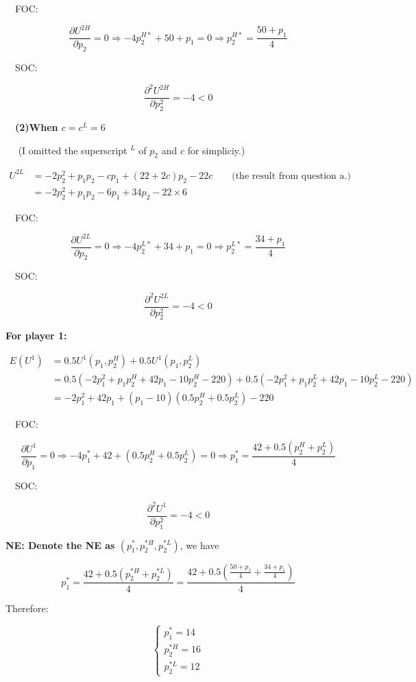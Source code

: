 \documentclass{article}
\begin{document}
$\quad $FOC:

$$\frac{\partial U^{2H}}{\partial p_2} = 0 \Rightarrow -4p^{H*}_2+ 50 + p_1 = 0 \Rightarrow p^{H*}_2 = \frac{50+p_1}{4}$$

$\quad $SOC:

$$\frac{\partial^2 U^{2H}}{\partial p^2_2} = -4 <0$$



\textbf{$\quad $(2)When $c=c^L=6$}

\smallskip

$\quad $ (I omitted the superscript $^L$ of $p_2$ and $c$ for simpliciy.)

\begin{align*}
U^{2L} &= -2p_2^2 +p_1p_2 -cp_1 + (22+2c)p_2 -22c \quad \quad \text{(the result from question a.)}  \\
&= -2p_2^2 +p_1p_2 -6p_1 + 34p_2 -22 \times 6
\end{align*}


$\quad $FOC:

$$\frac{\partial U^{2L}}{\partial p_2} = 0 \Rightarrow -4p^{L*}_2+ 34 + p_1 = 0 \Rightarrow p^{L*}_2 = \frac{34+p_1}{4}$$

$\quad $SOC:

$$\frac{\partial^2 U^{2L}}{\partial p^2_2} = -4 <0$$



\textbf{For player 1:}

\begin{align*}
E(U^1)&= 0.5 U^1(p_1,p_2^H) + 0.5 U^1(p_1,p_2^L) \\
&= 0.5(-2p_1^2 +p_1p^H_2 + 42p_1 - 10p^H_2 -220) + 0.5(-2p_1^2 +p_1p^L_2 + 42p_1 - 10p^L_2 -220)\\
&=-2p_1^2 + 42p_1 +(p_1 -10)(0.5p^H_2 + 0.5p^L_2) -220
\end{align*}

$\quad $FOC:

$$\frac{\partial U^{1}}{\partial p_1} = 0 \Rightarrow -4p^{*}_1+ 42 +(0.5p^H_2 + 0.5p^L_2) = 0 \Rightarrow p^{*}_1 = \frac{42 + 0.5(p^H_2 + p^L_2)}{4}$$

$\quad $SOC:

$$\frac{\partial^2 U^{1}}{\partial p^2_1} = -4 <0$$


\textbf{NE: Denote the NE as $(p^*_1,p^{*H}_2,p^{*L}_2)$}, we have


$$p^{*}_1 = \frac{42 + 0.5(p^{*H}_2 + p^{*L}_2)}{4}= \frac{42 + 0.5(\frac{50+p_1}{4} + \frac{34+p_1}{4})}{4} $$

Therefore: 

\begin{equation}
    \begin{cases}
p^*_1 = 14 \\ p^{*H}_2 = 16 \\ p^{*L}_2 =12
    \end{cases}
\nonumber
\end{equation}
\end{document}
